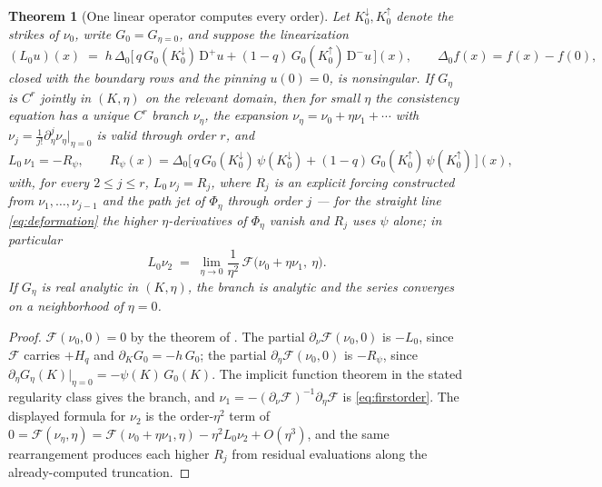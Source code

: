 \documentclass[11pt]{article}
\newtheorem{theorem}{Theorem}
\begin{document}
\begin{theorem}[One linear operator computes every order]\label{thm:hierarchy}
Let $K^{\downarrow}_0, K^{\uparrow}_0$ denote the strikes of $\nu_0$, write $G_0 = G_{\eta = 0}$, and suppose the linearization
\begin{equation}
(L_0 u)(x) \;=\; h\,\Delta_0\Big[\, q\,G_0(K^{\downarrow}_0)\,\mathrm{D}^{+}u + (1-q)\,G_0(K^{\uparrow}_0)\,\mathrm{D}^{-}u \,\Big](x),
\qquad \Delta_0 f(x) = f(x) - f(0),
\label{eq:L0}
\end{equation}
closed with the boundary rows and the pinning $u(0)=0$, is nonsingular. If $G_\eta$ is $C^r$ jointly in $(K, \eta)$ on the relevant domain, then for small $\eta$ the consistency equation has a unique $C^r$ branch $\nu_\eta$, the expansion $\nu_\eta = \nu_0 + \eta\nu_1 + \cdots$ with $\nu_j = \tfrac{1}{j!}\partial_\eta^j \nu_\eta|_{\eta=0}$ is valid through order $r$, and
\begin{equation}
L_0\,\nu_1 = -R_\psi,
\qquad
R_\psi(x) = \Delta_0\Big[\, q\,G_0(K^{\downarrow}_0)\,\psi(K^{\downarrow}_0) + (1-q)\,G_0(K^{\uparrow}_0)\,\psi(K^{\uparrow}_0) \,\Big](x),
\label{eq:firstorder}
\end{equation}
with, for every $2 \le j \le r$, $L_0\,\nu_j = R_j$, where $R_j$ is an explicit forcing constructed from $\nu_1, \dots, \nu_{j-1}$ and the path jet of $\Phi_\eta$ through order $j$ --- for the straight line \eqref{eq:deformation} the higher $\eta$-derivatives of $\Phi_\eta$ vanish and $R_j$ uses $\psi$ alone; in particular
\[
L_0 \nu_2 \;=\; \lim_{\eta\to 0}\frac{1}{\eta^{2}}\,\mathcal F\big(\nu_0 + \eta \nu_1,\ \eta\big).
\]
If $G_\eta$ is real analytic in $(K,\eta)$, the branch is analytic and the series converges on a neighborhood of $\eta = 0$.
\end{theorem}

\begin{proof}
$\mathcal F(\nu_0, 0) = 0$ by the theorem of \citet{cotton2026skew}. The partial $\partial_\nu \mathcal F(\nu_0, 0)$ is $-L_0$, since $\mathcal F$ carries $+H_q$ and $\partial_K G_0 = -h\,G_0$; the partial $\partial_\eta \mathcal F(\nu_0, 0)$ is $-R_\psi$, since $\partial_\eta G_\eta(K)\big|_{\eta=0} = -\psi(K)\,G_0(K)$. The implicit function theorem in the stated regularity class gives the branch, and $\nu_1 = -(\partial_\nu \mathcal F)^{-1}\partial_\eta \mathcal F$ is \eqref{eq:firstorder}. The displayed formula for $\nu_2$ is the order-$\eta^2$ term of $0 = \mathcal F(\nu_\eta, \eta) = \mathcal F(\nu_0 + \eta\nu_1, \eta) - \eta^2 L_0\nu_2 + O(\eta^3)$, and the same rearrangement produces each higher $R_j$ from residual evaluations along the already-computed truncation.
\end{proof}
\end{document}
